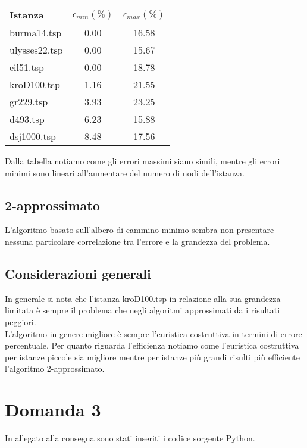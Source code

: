 \documentclass{article}
\begin{document}
\begin{table}[H]
	\begin{tabular}{lcc}
		\toprule
		Istanza       & $\epsilon_{min}(\%)$ & $\epsilon_{max}(\%)$ \\
		\midrule
		burma14.tsp   & 0.00                 & 16.58                \\
		ulysses22.tsp & 0.00                 & 15.67                \\
		eil51.tsp     & 0.00                 & 18.78                \\
		kroD100.tsp   & 1.16                 & 21.55                \\
		gr229.tsp     & 3.93                 & 23.25                \\
		d493.tsp      & 6.23                 & 15.88                \\
		dsj1000.tsp   & 8.48                 & 17.56                \\
		\bottomrule
	\end{tabular}
\end{table}

\noindent Dalla tabella notiamo come gli errori massimi siano simili, mentre gli errori minimi sono lineari all'aumentare del numero di nodi dell'istanza.

\subsection*{2-approssimato}
L'algoritmo basato sull'albero di cammino minimo sembra non presentare nessuna particolare correlazione tra l'errore e la grandezza del problema.

\subsection*{Considerazioni generali}
In generale si nota che l'istanza kroD100.tsp in relazione alla sua grandezza limitata è sempre il problema che negli algoritmi approssimati da i risultati peggiori.\\
L'algoritmo in genere migliore è sempre l'euristica costruttiva in termini di errore percentuale. Per quanto riguarda l'efficienza notiamo come l'euristica costruttiva per istanze piccole sia migliore mentre per istanze più grandi risulti più efficiente l'algoritmo 2-approssimato.

\section*{Domanda 3}
In allegato alla consegna sono stati inseriti i codice sorgente Python.
\end{document}
